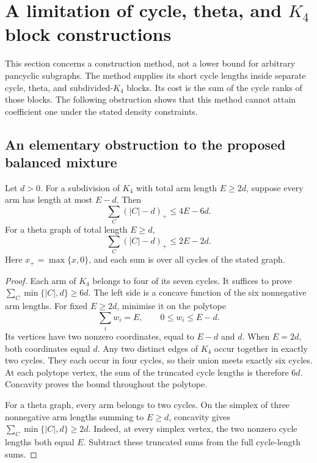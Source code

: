 \section{A limitation of cycle, theta, and $K_4$ block constructions}
\label{sec:rhost-block-barrier}

This section concerns a construction method, not a lower bound for arbitrary pancyclic subgraphs.
The method supplies its short cycle lengths inside separate cycle, theta, and subdivided-$K_4$ blocks.
Its cost is the sum of the cycle ranks of those blocks.
The following obstruction shows that this method cannot attain coefficient one under the stated density constraints.

\subsection{An elementary obstruction to the proposed balanced mixture}

\begin{lemma}\label{lem:rhost-excess-length}
Let $d>0$.
For a subdivision of $K_4$ with total arm length $E\ge2d$, suppose every arm has length at most $E-d$.
Then
\[
 \sum_C(|C|-d)_+\le4E-6d.
\]
For a theta graph of total length $E\ge d$,
\[
 \sum_C(|C|-d)_+\le2E-2d.
\]
Here $x_+=\max\{x,0\}$, and each sum is over all cycles of the stated graph.
\end{lemma}

\begin{proof}
Each arm of $K_4$ belongs to four of its seven cycles.
It suffices to prove $\sum_C\min\{|C|,d\}\ge6d$.
The left side is a concave function of the six nonnegative arm lengths.
For fixed $E\ge2d$, minimise it on the polytope
\[
 \sum_iw_i=E,\qquad 0\le w_i\le E-d.
\]
Its vertices have two nonzero coordinates, equal to $E-d$ and $d$.
When $E=2d$, both coordinates equal $d$.
Any two distinct edges of $K_4$ occur together in exactly two cycles.
They each occur in four cycles, so their union meets exactly six cycles.
At each polytope vertex, the sum of the truncated cycle lengths is therefore $6d$.
Concavity proves the bound throughout the polytope.

For a theta graph, every arm belongs to two cycles.
On the simplex of three nonnegative arm lengths summing to $E\ge d$,
concavity gives $\sum_C\min\{|C|,d\}\ge2d$.
Indeed, at every simplex vertex, the two nonzero cycle lengths both equal $E$.
Subtract these truncated sums from the full cycle-length sums.
\end{proof}

